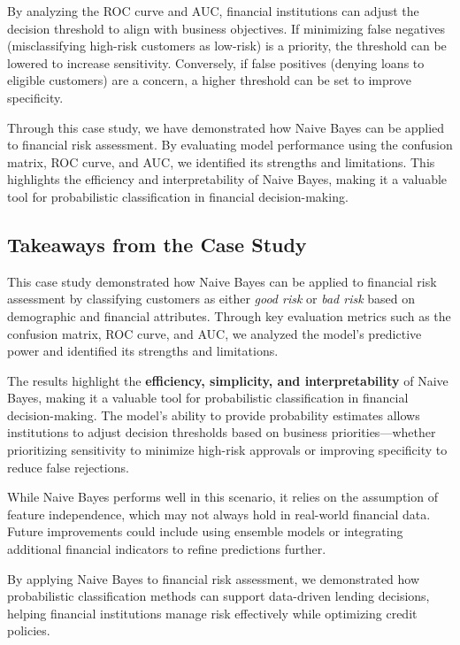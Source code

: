 \documentclass[
]{book}
\theoremstyle{definition}
\theoremstyle{definition}
\theoremstyle{definition}
\theoremstyle{definition}
\theoremstyle{remark}
\begin{document}
By analyzing the ROC curve and AUC, financial institutions can adjust the decision threshold to align with business objectives. If minimizing false negatives (misclassifying high-risk customers as low-risk) is a priority, the threshold can be lowered to increase sensitivity. Conversely, if false positives (denying loans to eligible customers) are a concern, a higher threshold can be set to improve specificity.

Through this case study, we have demonstrated how Naive Bayes can be applied to financial risk assessment. By evaluating model performance using the confusion matrix, ROC curve, and AUC, we identified its strengths and limitations. This highlights the efficiency and interpretability of Naive Bayes, making it a valuable tool for probabilistic classification in financial decision-making.

\subsection*{Takeaways from the Case Study}\label{takeaways-from-the-case-study}

This case study demonstrated how Naive Bayes can be applied to financial risk assessment by classifying customers as either \emph{good risk} or \emph{bad risk} based on demographic and financial attributes. Through key evaluation metrics such as the confusion matrix, ROC curve, and AUC, we analyzed the model's predictive power and identified its strengths and limitations.

The results highlight the \textbf{efficiency, simplicity, and interpretability} of Naive Bayes, making it a valuable tool for probabilistic classification in financial decision-making. The model's ability to provide probability estimates allows institutions to adjust decision thresholds based on business priorities---whether prioritizing sensitivity to minimize high-risk approvals or improving specificity to reduce false rejections.

While Naive Bayes performs well in this scenario, it relies on the assumption of feature independence, which may not always hold in real-world financial data. Future improvements could include using ensemble models or integrating additional financial indicators to refine predictions further.

By applying Naive Bayes to financial risk assessment, we demonstrated how probabilistic classification methods can support data-driven lending decisions, helping financial institutions manage risk effectively while optimizing credit policies.
\end{document}
